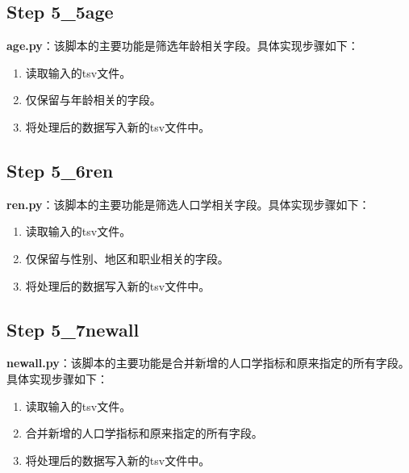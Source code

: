 \documentclass[UTF8]{report}
\theoremstyle{MyLineTheoremStyle} %
\theoremstyle{MyBlockTheoremStyle} %
\theoremstyle{MySubsubsectionStyle} %
\begin{document}
\subsection*{Step 5\_5age}

\textbf{age.py}：该脚本的主要功能是筛选年龄相关字段。具体实现步骤如下：
\begin{enumerate}
    \item 读取输入的tsv文件。
    \item 仅保留与年龄相关的字段。
    \item 将处理后的数据写入新的tsv文件中。
\end{enumerate}


\subsection*{Step 5\_6ren}

\textbf{ren.py}：该脚本的主要功能是筛选人口学相关字段。具体实现步骤如下：
\begin{enumerate}
    \item 读取输入的tsv文件。
    \item 仅保留与性别、地区和职业相关的字段。
    \item 将处理后的数据写入新的tsv文件中。
\end{enumerate}

\subsection*{Step 5\_7newall}

\textbf{newall.py}：该脚本的主要功能是合并新增的人口学指标和原来指定的所有字段。具体实现步骤如下：
\begin{enumerate}
    \item 读取输入的tsv文件。
    \item 合并新增的人口学指标和原来指定的所有字段。
    \item 将处理后的数据写入新的tsv文件中。
\end{enumerate}
\end{document}
